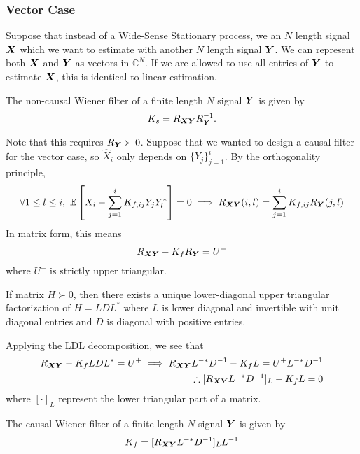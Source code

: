 \subsubsection{Vector Case}
Suppose that instead of a Wide-Sense Stationary process, we an $N$ length signal $\boldsymbol{X}$ which we want to estimate with another $N$ length signal $\boldsymbol{Y}$.
We can represent both $\boldsymbol{X}$ and $\boldsymbol{Y}$ as vectors in $\mathbb{C}^N$.
If we are allowed to use all entries of $\boldsymbol{Y}$ to estimate $\boldsymbol{X}$, this is identical to linear estimation.
\begin{definition}
	The non-causal Wiener filter of a finite length $N$ signal $\boldsymbol{Y}$ is given by \[
		K_s = R_{\boldsymbol{X}\boldsymbol{Y}}R_{\boldsymbol{Y}}^{-1}.
	\]
	\label{defn:noncausal-vector-wiener}
\end{definition}
Note that this requires $R_{\boldsymbol{Y}} \succ 0$.
Suppose that we wanted to design a causal filter for the vector case, so $\hat{X}_i$ only depends on $\{Y_j\}_{j=1}^i$.
By the orthogonality principle,
\[
	\forall 1 \leq l \leq i,\ \mathbb{E}\left[X_i - \sum_{j=1}^iK_{f, ij}Y_jY_l^*\right] = 0 \implies R_{\boldsymbol{XY}}(i, l) = \sum_{j=1}^i K_{f, ij}R_{\boldsymbol{Y}}(j, l)
\]
In matrix form, this means
\[
	R_{\boldsymbol{XY}} - K_fR_{\boldsymbol{Y}} = U^+
\]
where $U^+$ is strictly upper triangular.
\begin{theorem}
	If matrix $H \succ 0$, then there exists a unique lower-diagonal upper triangular factorization of $H=LDL^*$ where $L$ is lower diagonal and invertible with unit diagonal entries and $D$ is diagonal with positive entries.
	\label{thm:ldl-decomp}
\end{theorem}
Applying the LDL decomposition, we see that
\begin{align*}
	R_{\boldsymbol{XY}} - K_fLDL^* = U^+ \implies R_{\boldsymbol{XY}}L^{-*}D^{-1} -K_f L = U^+L^{-*}D^{-1}\\
	\therefore [R_{\boldsymbol{XY}}L^{-*}D^{-1}]_L -K_f L = 0
\end{align*}
where $[\cdot]_L$ represent the lower triangular part of a matrix.
\begin{definition}
	The causal Wiener filter of a finite length $N$ signal $\boldsymbol{Y}$ is given by \[
		K_f = [R_{\boldsymbol{XY}}L^{-*}D^{-1}]_LL^{-1}
	\]
	\label{defn:causal-vector-wiener}
\end{definition}


